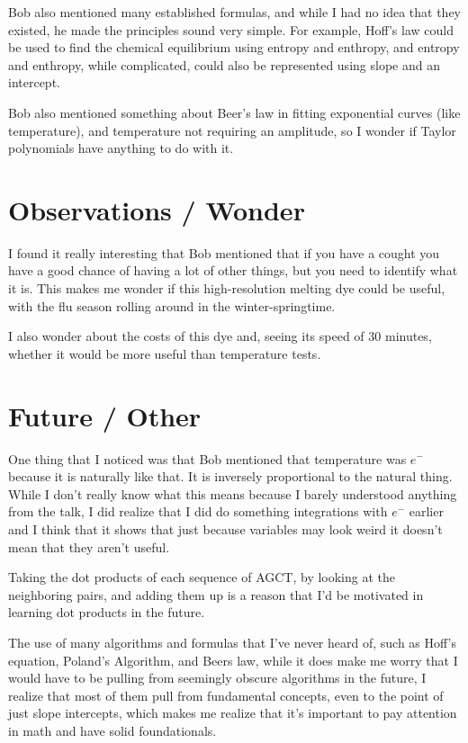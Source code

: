 \documentclass[12pt]{article}
\begin{document}
Bob also mentioned many established formulas, and while I had no idea that they existed, he made the principles sound very simple. For example, Hoff's law could be used to find the chemical equilibrium using entropy and enthropy, and entropy and enthropy, while complicated, could also be represented using slope and an intercept. 

Bob also mentioned something about Beer's law in fitting exponential curves (like temperature), and temperature not requiring an amplitude, so I wonder if Taylor polynomials have anything to do with it.

\section{Observations / Wonder}
I found it really interesting that Bob mentioned that if you have a cought you have a good chance of having a lot of other things, but you need to identify what it is. This makes me wonder if this high-resolution melting dye could be useful, with the flu season rolling around in the winter-springtime. 

I also wonder about the costs of this dye and, seeing its speed of 30 minutes, whether it would be more useful than temperature tests. 

\section{Future / Other}
One thing that I noticed was that Bob mentioned that temperature was $e^{-}$ because it is naturally like that. It is inversely proportional to the natural thing. While I don't really know what this means because I barely understood anything from the talk, I did realize that I did do something integrations with $e^{-}$ earlier and I think that it shows that just because variables may look weird it doesn't mean that they aren't useful.

Taking the dot products of each sequence of AGCT, by looking at the neighboring pairs, and adding them up is a reason that I'd be motivated in learning dot products in the future. 

The use of many algorithms and formulas that I've never heard of, such as Hoff's equation, Poland's Algorithm, and Beers law, while it does make me worry that I would have to be pulling from seemingly obscure algorithms in the future, I realize that most of them pull from fundamental concepts, even to the point of just slope intercepts, which makes me realize that it's important to pay attention in math and have solid foundationals. 
\end{document}
